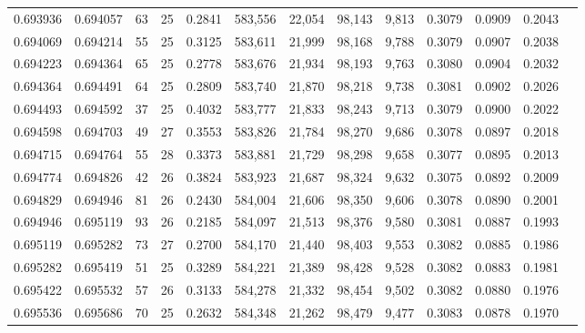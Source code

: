 \begin{tabular}{rrrrrrrrrrrrr}
0.693936 & 0.694057 &  63 &  25 &                                     0.2841 & 583,556 &  22,054 &  98,143 &   9,813 & 0.3079 & 0.0909 & 0.2043 \\
0.694069 & 0.694214 &  55 &  25 &                                     0.3125 & 583,611 &  21,999 &  98,168 &   9,788 & 0.3079 & 0.0907 & 0.2038 \\
0.694223 & 0.694364 &  65 &  25 &                                     0.2778 & 583,676 &  21,934 &  98,193 &   9,763 & 0.3080 & 0.0904 & 0.2032 \\
0.694364 & 0.694491 &  64 &  25 &                                     0.2809 & 583,740 &  21,870 &  98,218 &   9,738 & 0.3081 & 0.0902 & 0.2026 \\
0.694493 & 0.694592 &  37 &  25 &                                     0.4032 & 583,777 &  21,833 &  98,243 &   9,713 & 0.3079 & 0.0900 & 0.2022 \\
0.694598 & 0.694703 &  49 &  27 &                                     0.3553 & 583,826 &  21,784 &  98,270 &   9,686 & 0.3078 & 0.0897 & 0.2018 \\
0.694715 & 0.694764 &  55 &  28 &                                     0.3373 & 583,881 &  21,729 &  98,298 &   9,658 & 0.3077 & 0.0895 & 0.2013 \\
0.694774 & 0.694826 &  42 &  26 &                                     0.3824 & 583,923 &  21,687 &  98,324 &   9,632 & 0.3075 & 0.0892 & 0.2009 \\
0.694829 & 0.694946 &  81 &  26 &                                     0.2430 & 584,004 &  21,606 &  98,350 &   9,606 & 0.3078 & 0.0890 & 0.2001 \\
0.694946 & 0.695119 &  93 &  26 &                                     0.2185 & 584,097 &  21,513 &  98,376 &   9,580 & 0.3081 & 0.0887 & 0.1993 \\
0.695119 & 0.695282 &  73 &  27 &                                     0.2700 & 584,170 &  21,440 &  98,403 &   9,553 & 0.3082 & 0.0885 & 0.1986 \\
0.695282 & 0.695419 &  51 &  25 &                                     0.3289 & 584,221 &  21,389 &  98,428 &   9,528 & 0.3082 & 0.0883 & 0.1981 \\
0.695422 & 0.695532 &  57 &  26 &                                     0.3133 & 584,278 &  21,332 &  98,454 &   9,502 & 0.3082 & 0.0880 & 0.1976 \\
0.695536 & 0.695686 &  70 &  25 &                                     0.2632 & 584,348 &  21,262 &  98,479 &   9,477 & 0.3083 & 0.0878 & 0.1970 \\

\end{tabular}
